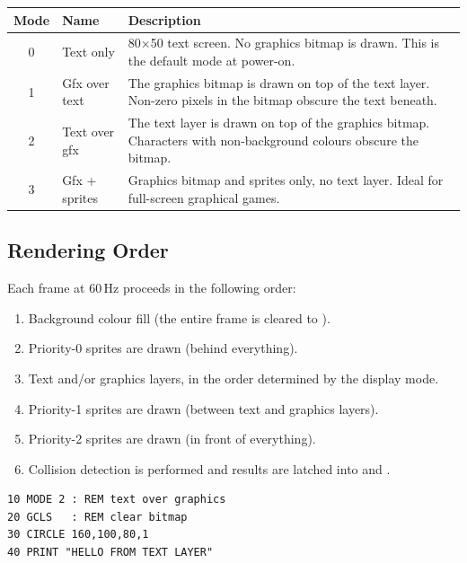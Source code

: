 \begin{center}
\small
\begin{tabular}{@{}clp{22em}@{}}
\toprule
\textbf{Mode} & \textbf{Name} & \textbf{Description} \\
\midrule
0 & Text only     & 80$\times$50 text screen.  No graphics bitmap is drawn.
                     This is the default mode at power-on. \\
1 & Gfx over text & The graphics bitmap is drawn on top of the text layer.
                     Non-zero pixels in the bitmap obscure the text beneath. \\
2 & Text over gfx & The text layer is drawn on top of the graphics bitmap.
                     Characters with non-background colours obscure the bitmap. \\
3 & Gfx + sprites & Graphics bitmap and sprites only, no text layer.
                     Ideal for full-screen graphical games. \\
\bottomrule
\end{tabular}
\end{center}

\subsection*{Rendering Order}

Each frame at 60\,Hz proceeds in the following order:

\begin{enumerate}
  \item Background colour fill (the entire frame is cleared to ).
  \item Priority-0 sprites are drawn (behind everything).
  \item Text and/or graphics layers, in the order determined by the display mode.
  \item Priority-1 sprites are drawn (between text and graphics layers).
  \item Priority-2 sprites are drawn (in front of everything).
  \item Collision detection is performed and results are latched into
         and .
\end{enumerate}

\begin{lstlisting}
10 MODE 2 : REM text over graphics
20 GCLS   : REM clear bitmap
30 CIRCLE 160,100,80,1
40 PRINT "HELLO FROM TEXT LAYER"
\end{lstlisting}


